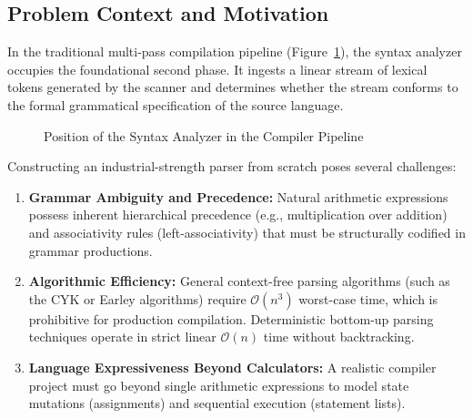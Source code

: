 \documentclass[11pt,a4paper]{article}
\begin{document}
\subsection{Problem Context and Motivation}
In the traditional multi-pass compilation pipeline (Figure~\ref{fig:pipeline}), the syntax analyzer occupies the foundational second phase. It ingests a linear stream of lexical tokens generated by the scanner and determines whether the stream conforms to the formal grammatical specification of the source language. 

\begin{figure}[h]
\centering
{}
\caption{Position of the Syntax Analyzer in the Compiler Pipeline}
\label{fig:pipeline}
\end{figure}

Constructing an industrial-strength parser from scratch poses several challenges:
\begin{enumerate}
    \item \textbf{Grammar Ambiguity and Precedence:} Natural arithmetic expressions possess inherent hierarchical precedence (e.g., multiplication over addition) and associativity rules (left-associativity) that must be structurally codified in grammar productions.
    \item \textbf{Algorithmic Efficiency:} General context-free parsing algorithms (such as the CYK or Earley algorithms) require $\mathcal{O}(n^3)$ worst-case time, which is prohibitive for production compilation. Deterministic bottom-up parsing techniques operate in strict linear $\mathcal{O}(n)$ time without backtracking.
    \item \textbf{Language Expressiveness Beyond Calculators:} A realistic compiler project must go beyond single arithmetic expressions to model state mutations (assignments) and sequential execution (statement lists).
\end{enumerate}
\end{document}
